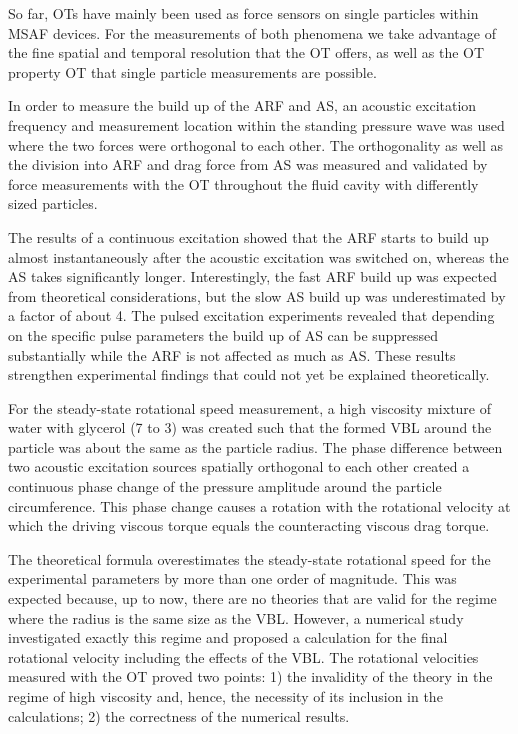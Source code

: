 So far, OTs have mainly been used as force sensors on single particles within 
MSAF devices. For the measurements of both phenomena we take advantage of the 
fine spatial and temporal resolution that the OT offers, as well as the OT 
property OT that single particle measurements are possible.

In order to measure the build up of the ARF and AS, an acoustic excitation 
frequency and measurement location within the standing pressure wave was used 
where the two forces were orthogonal to each other. The orthogonality as well 
as the division into ARF and drag force from AS was measured and validated by 
force measurements with the OT throughout the fluid cavity with differently 
sized particles.

The results of a continuous excitation showed that the ARF starts to build up 
almost instantaneously after the acoustic excitation was switched on, whereas 
the AS takes significantly longer. Interestingly, the fast ARF build up was 
expected from theoretical considerations, but the slow AS build up was 
underestimated by a factor of about 4. The pulsed excitation experiments 
revealed that depending on the specific pulse parameters the build up of AS can 
be suppressed substantially while the ARF is not affected as much as AS. These 
results strengthen experimental findings that could not yet be explained 
theoretically.

For the steady-state rotational speed measurement, a high viscosity mixture of 
water with glycerol (7 to 3) was created such that the formed VBL around the 
particle was about the same as the particle radius. The phase difference 
between two acoustic excitation sources spatially orthogonal to each other 
created a continuous phase change of the pressure amplitude around the particle 
circumference. This phase change causes a rotation with the rotational velocity 
at which the driving viscous torque equals the counteracting viscous drag 
torque.

The theoretical formula overestimates the steady-state rotational speed for the 
experimental parameters by more than one order of magnitude. This was expected 
because, up to now, there are no theories that are valid for the regime where 
the radius is the same size as the VBL. However, a numerical study investigated 
exactly this regime and proposed a calculation for the final rotational 
velocity including the effects of the VBL. The rotational velocities measured 
with the OT proved two points: 1) the invalidity of the theory in the regime of 
high viscosity and, hence, the necessity of its inclusion in the calculations; 
2) the correctness of the numerical results.

